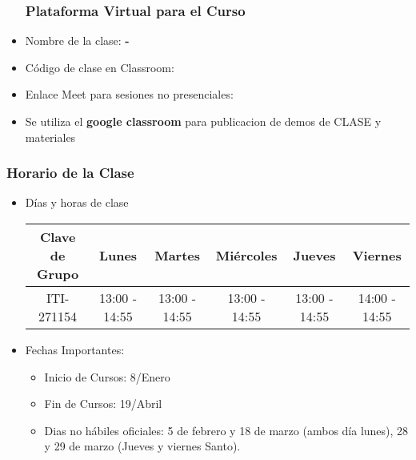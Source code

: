 


\begin{frame}
\begin{itemize}
\frametitle{Plataforma Virtual para el Curso}
\item Nombre de la clase: \textbf{\nombreMateria-\cuatrimestre}
\item Código de clase en Classroom: \textbf{\claveClassroom}
\item Enlace Meet para sesiones no presenciales: \textbf{\claveMeet}
\item Se utiliza el \textbf{google classroom} para publicacion de demos de CLASE y materiales
\end{itemize}
\end{frame}



\begin{frame}
\frametitle{Horario de la Clase}


\begin{itemize}
\item Días y horas de clase
\tiny
\begin{spacing}{1.0}
\begin{center}
\begin{tabular}{c|ccccc}
\hline 
\textbf{Clave de Grupo}   & Lunes         & Martes        & Miércoles     & Jueves        & Viernes          \\ \hline 
ITI-271154                & 13:00 - 14:55 & 13:00 - 14:55 & 13:00 - 14:55 & 13:00 - 14:55 & 14:00 - 14:55    \\ \hline     
\hline
\end{tabular}
\end{center}
\end{spacing}
\normalsize
\item Fechas Importantes:
\begin{itemize}
\item Inicio de Cursos: 8/Enero
\item Fin de Cursos: 19/Abril
\item Dias no hábiles oficiales: 5 de febrero y 18 de marzo (ambos d\'ia lunes), 28 y 29 de marzo (Jueves y viernes Santo). 
\end{itemize}
\end{itemize}

\end{frame}


